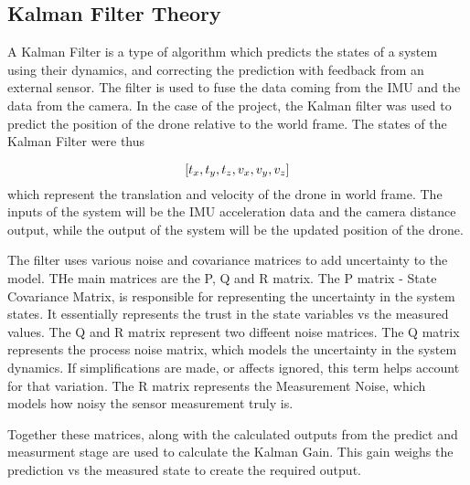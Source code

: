 \documentclass[bare_jrnl_transmag]{subfiles}
\begin{document}
\subsection{Kalman Filter Theory}
A Kalman Filter is a type of algorithm which predicts the states of a system using their dynamics, and correcting the prediction with feedback from an external sensor. The filter is used to fuse the data coming from the IMU and the data from the camera. 
In the case of the project, the Kalman filter was used to predict the position of the drone relative to the world frame. The states of the Kalman Filter were thus 

\begin{equation}$$ [ t_x, t_y, t_z, v_x, v_y, v_z ] $$ \end{equation}  which represent the translation and velocity of the drone in world frame. 
The inputs of the system will be the IMU acceleration data and the camera distance output, while the output of the system will be the updated position of the drone.

The filter uses various noise and covariance matrices to add uncertainty to the model. THe main matrices are the P, Q and R matrix. The P matrix - State Covariance Matrix, is responsible for representing the uncertainty in the system states. It essentially represents the trust in the state variables vs the measured values.
The Q and R matrix represent two diffeent noise matrices. The Q matrix represents the process noise matrix, which models the uncertainty in the system dynamics. If simplifications are made, or affects ignored, this term helps account for that variation. The R matrix represents the Measurement Noise, which models how noisy the sensor measurement truly is. 

Together these matrices, along with the calculated outputs from the predict and measurment stage are used to calculate the Kalman Gain. This gain weighs the prediction vs the measured state to create the required output. 
\end{document}
